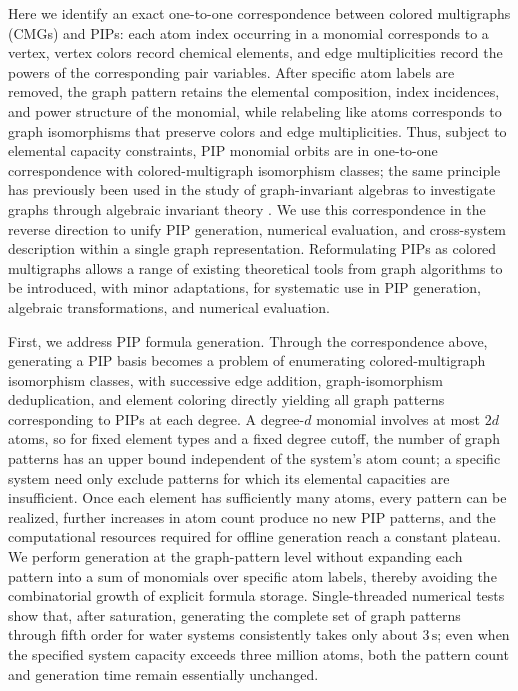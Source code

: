 Here we identify an exact one-to-one correspondence between colored multigraphs (CMGs) and PIPs: each atom index occurring in a monomial corresponds to a vertex, vertex colors record chemical elements, and edge multiplicities record the powers of the corresponding pair variables.
After specific atom labels are removed, the graph pattern retains the elemental composition, index incidences, and power structure of the monomial, while relabeling like atoms corresponds to graph isomorphisms that preserve colors and edge multiplicities.
Thus, subject to elemental capacity constraints, PIP monomial orbits are in one-to-one correspondence with colored-multigraph isomorphism classes; the same principle has previously been used in the study of graph-invariant algebras to investigate graphs through algebraic invariant theory \cite{Thiery2000GraphInvariants}.
We use this correspondence in the reverse direction to unify PIP generation, numerical evaluation, and cross-system description within a single graph representation.
Reformulating PIPs as colored multigraphs allows a range of existing theoretical tools from graph algorithms to be introduced, with minor adaptations, for systematic use in PIP generation, algebraic transformations, and numerical evaluation.

First, we address PIP formula generation.
Through the correspondence above, generating a PIP basis becomes a problem of enumerating colored-multigraph isomorphism classes, with successive edge addition, graph-isomorphism deduplication, and element coloring directly yielding all graph patterns corresponding to PIPs at each degree.
A degree-\(d\) monomial involves at most \(2d\) atoms, so for fixed element types and a fixed degree cutoff, the number of graph patterns has an upper bound independent of the system's atom count; a specific system need only exclude patterns for which its elemental capacities are insufficient.
Once each element has sufficiently many atoms, every pattern can be realized, further increases in atom count produce no new PIP patterns, and the computational resources required for offline generation reach a constant plateau.
We perform generation at the graph-pattern level without expanding each pattern into a sum of monomials over specific atom labels, thereby avoiding the combinatorial growth of explicit formula storage.
Single-threaded numerical tests show that, after saturation, generating the complete set of graph patterns through fifth order for water systems consistently takes only about \(3\,\mathrm{s}\); even when the specified system capacity exceeds three million atoms, both the pattern count and generation time remain essentially unchanged.

